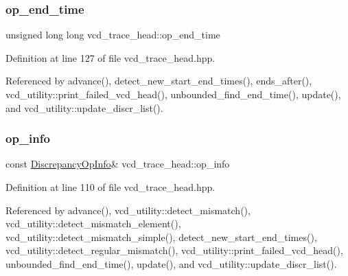 \subsubsection{\texorpdfstring{op\+\_\+end\+\_\+time}{op\_end\_time}}
{\footnotesize\ttfamily unsigned long long vcd\+\_\+trace\+\_\+head\+::op\+\_\+end\+\_\+time}



Definition at line 127 of file vcd\+\_\+trace\+\_\+head.\+hpp.



Referenced by advance(), detect\+\_\+new\+\_\+start\+\_\+end\+\_\+times(), ends\+\_\+after(), vcd\+\_\+utility\+::print\+\_\+failed\+\_\+vcd\+\_\+head(), unbounded\+\_\+find\+\_\+end\+\_\+time(), update(), and vcd\+\_\+utility\+::update\+\_\+discr\+\_\+list().

\mbox{\label{structvcd__trace__head_ab9af239642c986de4ac370c4f1aac89d}} 
\subsubsection{\texorpdfstring{op\+\_\+info}{op\_info}}
{\footnotesize\ttfamily const \hyperlink{classDiscrepancyOpInfo}{Discrepancy\+Op\+Info}\& vcd\+\_\+trace\+\_\+head\+::op\+\_\+info}



Definition at line 110 of file vcd\+\_\+trace\+\_\+head.\+hpp.



Referenced by advance(), vcd\+\_\+utility\+::detect\+\_\+mismatch(), vcd\+\_\+utility\+::detect\+\_\+mismatch\+\_\+element(), vcd\+\_\+utility\+::detect\+\_\+mismatch\+\_\+simple(), detect\+\_\+new\+\_\+start\+\_\+end\+\_\+times(), vcd\+\_\+utility\+::detect\+\_\+regular\+\_\+mismatch(), vcd\+\_\+utility\+::print\+\_\+failed\+\_\+vcd\+\_\+head(), unbounded\+\_\+find\+\_\+end\+\_\+time(), update(), and vcd\+\_\+utility\+::update\+\_\+discr\+\_\+list().

\mbox{\label{structvcd__trace__head_af546fb3d7dd888de25ba81ac51eeef48}} 
